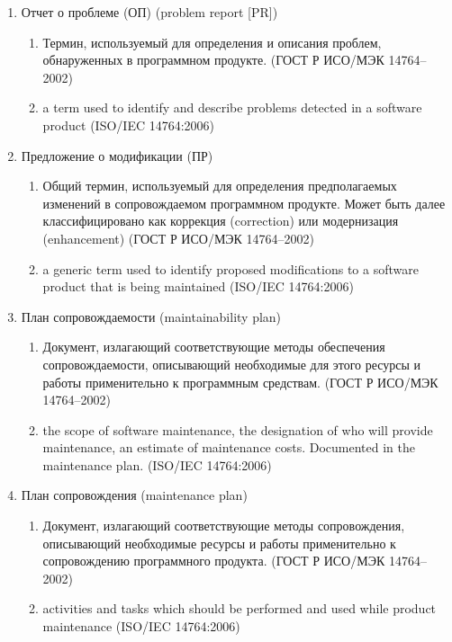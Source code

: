 \begin{enumerate}
    \item Отчет о проблеме (ОП) (problem report [PR])
    \begin{enumerate}
        \item Термин, используемый для определения и описания проблем, обнаруженных в программном продукте.
        (ГОСТ Р ИСО/МЭК 14764--2002)
        \item a term used to identify and describe problems detected in a software product
        (ISO/IEC 14764:2006)
    \end{enumerate}

    \item Предложение о модификации (ПР)
    \begin{enumerate}
        \item Общий термин, используемый для определения предполагаемых изменений в сопровождаемом программном продукте.
        Может быть далее классифицировано как коррекция (correction) или модернизация (enhancement)
        (ГОСТ Р ИСО/МЭК 14764--2002)
        \item a generic term used to identify proposed modifications to a software product that is being maintained
        (ISO/IEC 14764:2006)
    \end{enumerate}

    \item План сопровождаемости (maintainability plan)
    \begin{enumerate}
        \item Документ, излагающий соответствующие методы обеспечения сопровождаемости, описывающий необходимые для этого ресурсы и работы применительно к программным средствам.
        (ГОСТ Р ИСО/МЭК 14764--2002)
        \item the scope of software maintenance, the designation of who will provide maintenance, an estimate of maintenance costs.
        Documented in the maintenance plan.
        (ISO/IEC 14764:2006)
    \end{enumerate}

    \item План сопровождения (maintenance plan)
    \begin{enumerate}
        \item Документ, излагающий соответствующие методы сопровождения, описывающий необходимые ресурсы и работы применительно к сопровождению программного продукта.
        (ГОСТ Р ИСО/МЭК 14764--2002)
        \item activities and tasks which should be performed and used while product maintenance
        (ISO/IEC 14764:2006)
    \end{enumerate}


\end{enumerate}
